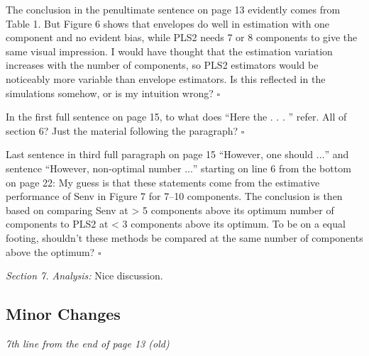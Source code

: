 \documentclass[11pt, a4paper]{article}
\begin{document}
The conclusion in the penultimate sentence on page 13 evidently comes from Table 1. But Figure 6 shows that envelopes do well in estimation with one component and no evident bias, while PLS2 needs 7 or 8 components to give the same visual impression. I would have thought that the estimation variation increases with the number of components, so PLS2 estimators would be noticeably more variable than envelope estimators. Is this reflected in the simulations somehow, or is my intuition wrong?
$\square$

In the first full sentence on page 15, to what does “Here the . . . ” refer. All of section 6? Just the material following the paragraph?
$\square$

Last sentence in third full paragraph on page 15 ``However, one should $\ldots$'' and sentence ``However, non-optimal number $\ldots$'' starting on line 6 from the bottom on page 22: My guess is that these statements come from the estimative performance of Senv in Figure 7 for 7–10 components. The conclusion is then based on comparing Senv at > 5 components above its optimum number of components to PLS2 at < 3 components above its optimum. To be on a equal footing, shouldn’t these methods be compared at the same number of components above the optimum?
$\square$

\textit{Section 7. Analysis:} Nice discussion. 

\subsection{Minor Changes}
\label{sec:minor-changes}
\textit{ 7th line from the end of page 13 (old)} 
\end{document}
